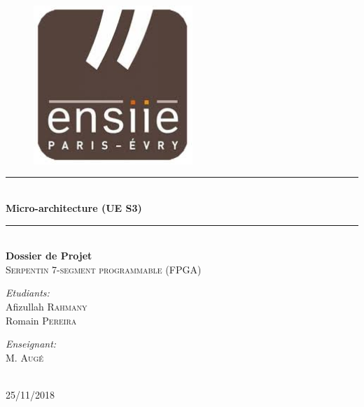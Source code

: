 \documentclass[10pt]{article}
\newcommand{\HRule}{\rule{\linewidth}{0.5mm}}
\begin{document}
    
    \begin{titlepage}
        \begin{sffamily}
            \begin{center}

                \begin{figure}[h!]
                    \includegraphics[width=6cm]{ensiie.jpeg}
                \end{figure}

                \HRule \\[0.8cm]
                { \huge \bfseries Micro-architecture (UE S3) } \\[0.4cm]
                \HRule \\[2.0cm]
                
                { \huge \bfseries Dossier de Projet } \\[0.5cm]

                \textsc{\Large Serpentin 7-segment programmable (FPGA)}\\[2.0cm]

                \vfill
                \begin{minipage}{0.4\textwidth}
                    \begin{flushleft} \large
                        \emph{Etudiants:} \\
                        Afizullah \textsc{Rahmany}\\
                        Romain \textsc{Pereira}\\
                    \end{flushleft}
                \end{minipage}
                \begin{minipage}{0.4\textwidth}
                    \begin{flushright} \large
                        \emph{Enseignant:}  \\
                        M. \textsc{Augé}
                    \end{flushright}
                \end{minipage}
                \\[2.0cm]
                {\large 25/11/2018}
            \end{center}
        \end{sffamily}
    \end{titlepage}
    
\end{document}

